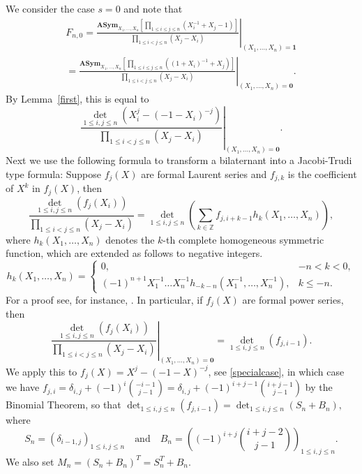 \documentclass[12pt,dvipsnames]{amsart}
\theoremstyle{definition}
\newcommand{\asym}{\mathbf{ASym}}
\begin{document}
We consider the case $s=0$ and note that 
\begin{multline*} 
F_{n,0} = \left. \frac{\asym_{X_1,\ldots,X_n} \left[ 
\prod_{1 \le i \le j \le n} (X_i^{-1}+ X_j-1) \right]}{\prod_{1 \le i < j \le n} (X_j-X_i)}  \right|_{(X_1,\ldots,X_n)=\mathbf{1}} \\
= 
\left. \frac{\asym_{X_1,\ldots,X_n} \left[ 
\prod_{1 \le i \le j \le n} ((1+X_i)^{-1}+ X_j) \right]}{\prod_{1 \le i < j \le n} (X_j-X_i)}  \right|_{(X_1,\ldots,X_n)=\mathbf{0}}.
\end{multline*}
By Lemma~\ref{first}, this is equal to 
\begin{equation}
\label{specialcase} 
\left. \frac{\det_{1 \le i,j \le n} \left(X_i^j - (-1-X_i)^{-j}\right)}{\prod_{1 \le i < j \le n} (X_j-X_i)}  
\right|_{(X_1,\ldots,X_n)=\mathbf{0}}.
\end{equation} 
Next we use the following formula to transform a bilaternant into a Jacobi-Trudi type formula: Suppose $f_j(X)$ are formal Laurent series and $f_{j,k}$ is the coefficient of $X^k$ in $f_j(X)$, then 
\begin{equation}
\label{limit1g} 
\frac{\det_{1 \le i,j \le n} (f_j(X_i))}{\prod_{1 \le i < j \le n}(X_j-X_i)} = \det_{1 \le i,j \le n} \left( \sum_{k \in \mathbb{Z}} f_{j,i+k-1} h_k(X_1,\ldots,X_n) \right),
\end{equation} 
where $h_k(X_1,\ldots,X_n)$ denotes the $k$-th complete homogeneous symmetric function, which are extended as follows to negative integers.
$$
h_{k}(X_1,\ldots,X_n) = 
\begin{cases}
0, &  -n < k < 0, \\
(-1)^{n+1} X_1^{-1}  \dots X_n^{-1} h_{-k-n}(X_1^{-1},\ldots,X_n^{-1}), & k \le -n.
\end{cases} 
$$
For a proof see, for instance, 
\cite[Lemma~7.2]{FS23}.
In particular, if $f_j(X)$ are formal power series, then 
\begin{equation}
\label{limit1}
\left. \frac{\det_{1 \le i,j \le n} (f_j(X_i))}{\prod_{1 \le i < j \le n}(X_j-X_i)}  \right|_{(X_1,\ldots,X_n)=\mathbf{0}}= \det_{1 \le i,j \le n} \left( f_{j,i-1} \right).
\end{equation} 
We apply this to $f_j(X)=X^j - (-1-X)^{-j}$, see \eqref{specialcase}, in which case we have 
$f_{j,i} = \delta_{i,j}+(-1)^{i}\binom{-i-1}{j-1}=\delta_{i,j}+(-1)^{i+j-1}\binom{i+j-1}{j-1}$ by the Binomial Theorem, so that 
$
\det_{1 \le i,j \le n} \left( f_{j,i-1} \right) = \det_{1 \le i,j \le n} \left( S_n + B_n\right), 
$
where 
$$
S_n = \left(\delta_{i-1,j}  \right)_{1 \le i,j \le n} \quad \text{and} \quad B_n= \left((-1)^{i+j}\binom{i+j-2}{j-1} \right)_{1 \le i,j \le n}.
$$
We also set $M_n=(S_n + B_n)^T=S_n^{T} + B_n$.
\end{document}
